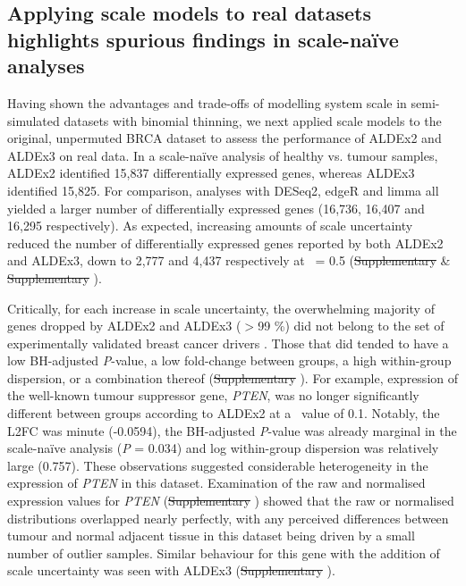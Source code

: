 \documentclass[10pt,letterpaper]{article}
\providecommand{\DIFdeltex}[1]{{\protect\color{red}\sout{#1}}}                      %
\providecommand{\DIFdelbegin}{} %
\providecommand{\DIFdelend}{} %
\providecommand{\DIFdel}[1]{\texorpdfstring{\DIFdeltex{#1}}{}} %
\newcommand{\DIFscaledelfig}{0.5}
\newlength{\DIFdelgraphicswidth} %
\newlength{\DIFdelgraphicsheight} %
\newcommand{\DIFdelincludegraphics}[2][]{%
\sbox{\DIFdelgraphicsbox}{\DIFOincludegraphics[#1]{#2}}%
\settoboxwidth{\DIFdelgraphicswidth}{\DIFdelgraphicsbox} %
\settoboxtotalheight{\DIFdelgraphicsheight}{\DIFdelgraphicsbox} %
\scalebox{\DIFscaledelfig}{%
\parbox[b]{\DIFdelgraphicswidth}{\usebox{\DIFdelgraphicsbox}\\[-\baselineskip] \rule{\DIFdelgraphicswidth}{0em}}\llap{\resizebox{\DIFdelgraphicswidth}{\DIFdelgraphicsheight}{%
\setlength{\unitlength}{\DIFdelgraphicswidth}%
\begin{picture}(1,1)%
\thicklines\linethickness{2pt} %
{\color[rgb]{1,0,0}\put(0,0){\framebox(1,1){}}}%
{\color[rgb]{1,0,0}\put(0,0){\line( 1,1){1}}}%
{\color[rgb]{1,0,0}\put(0,1){\line(1,-1){1}}}%
\end{picture}%
}\hspace*{3pt}}} %
} %
\DeclareRobustCommand{\DIFdelbegin}{\DIFOdelbegin \let\includegraphics\DIFdelincludegraphics} %
\DeclareRobustCommand{\DIFdelend}{\DIFOaddend \let\includegraphics\DIFOincludegraphics} %
\begin{document}
\subsection*{Applying scale models to real datasets highlights spurious findings in scale-na\"ive analyses}
Having shown the advantages and trade-offs of modelling system scale in semi-simulated datasets with binomial thinning, we next applied scale models to the original, unpermuted BRCA dataset to assess the performance of ALDEx2 and ALDEx3 on real data. In a scale-na\"ive analysis of healthy vs. tumour samples, ALDEx2 identified 15,837 differentially expressed genes, whereas ALDEx3 identified 15,825. For comparison, analyses with DESeq2, edgeR and limma all yielded a larger number of differentially expressed genes (16,736, 16,407 and 16,295 respectively). As expected, increasing amounts of scale uncertainty reduced the number of differentially expressed genes reported by both ALDEx2 and ALDEx3, down to 2,777 and 4,437 respectively at \textgamma~= 0.5 (\DIFdelbegin \DIFdel{Supplementary }\DIFdelend {} \&  \DIFdelbegin \DIFdel{Supplementary }\DIFdelend {}).

Critically, for each increase in scale uncertainty, the overwhelming majority of genes dropped by ALDEx2 and ALDEx3 ($>$99 \%) did not belong to the set of experimentally validated breast cancer drivers \cite{repana_network_2019}. Those that did tended to have a low BH-adjusted \textit{P}-value, a low fold-change between groups, a high within-group dispersion, or a combination thereof (\DIFdelbegin \DIFdel{Supplementary }\DIFdelend {}). For example, expression of the well-known tumour suppressor gene, \textit{PTEN}, was no longer significantly different between groups according to ALDEx2 at a \textgamma~value of 0.1. Notably, the L2FC was minute (-0.0594), the BH-adjusted \textit{P}-value was already marginal in the scale-na\"ive analysis (\textit{P} = 0.034) and log within-group dispersion was relatively large (0.757). These observations suggested considerable heterogeneity in the expression of \textit{PTEN} in this dataset. Examination of the raw and normalised expression values for \textit{PTEN} (\DIFdelbegin \DIFdel{Supplementary }\DIFdelend {}) showed that the raw or normalised distributions overlapped nearly perfectly, with any perceived differences between tumour and normal adjacent tissue in this dataset being driven by a small number of outlier samples. Similar behaviour for this gene with the addition of scale uncertainty was seen with ALDEx3 (\DIFdelbegin \DIFdel{Supplementary }\DIFdelend {}).
\end{document}
